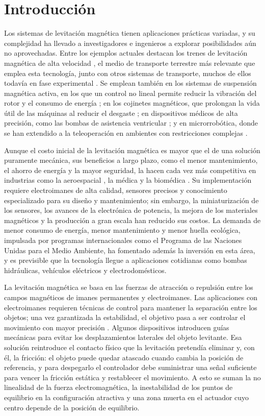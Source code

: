 \chapter{Introducción}

Los sistemas de levitación magnética tienen aplicaciones prácticas variadas, y su complejidad ha llevado a investigadores e ingenieros a explorar posibilidades aún no aprovechadas. Entre los ejemplos actuales destacan los trenes de levitación magnética de alta velocidad \cite{mingda}, el medio de transporte terrestre más relevante que emplea esta tecnología, junto con otros sistemas de transporte, muchos de ellos todavía en fase experimental \cite{hyung}. Se emplean también en los sistemas de suspensión magnética activa, en los que un control no lineal permite reducir la vibración del rotor y el consumo de energía \cite{charara}; en los cojinetes magnéticos, que prolongan la vida útil de las máquinas al reducir el desgaste \cite{debarghya}; en dispositivos médicos de alta precisión, como las bombas de asistencia ventricular \cite{gang1}; y en microrrobótica, donde se han extendido a la teleoperación en ambientes con restricciones complejas \cite{mir}.

Aunque el costo inicial de la levitación magnética es mayor que el de una solución puramente mecánica, sus beneficios a largo plazo, como el menor mantenimiento, el ahorro de energía y la mayor seguridad, la hacen cada vez más competitiva en industrias como la aeroespacial \cite{bryton}, la médica \cite{song} y la biomédica \cite{sajjad}. Su implementación requiere electroimanes de alta calidad, sensores precisos y conocimiento especializado para su diseño y mantenimiento; sin embargo, la miniaturización de los sensores, los avances de la electrónica de potencia, la mejora de los materiales magnéticos y la producción a gran escala han reducido sus costos. La demanda de menor consumo de energía, menor mantenimiento y menor huella ecológica, impulsada por programas internacionales como el Programa de las Naciones Unidas para el Medio Ambiente, ha fomentado además la inversión en esta área, y es previsible que la tecnología llegue a aplicaciones cotidianas como bombas hidráulicas, vehículos eléctricos y electrodomésticos.

La levitación magnética se basa en las fuerzas de atracción o repulsión entre los campos magnéticos de imanes permanentes y electroimanes. Las aplicaciones con electroimanes requieren técnicas de control para mantener la separación entre los objetos; una vez garantizada la estabilidad, el objetivo pasa a ser controlar el movimiento con mayor precisión \cite{hyung}. Algunos dispositivos introducen guías mecánicas para evitar los desplazamientos laterales del objeto levitante. Esa solución reintroduce el contacto físico que la levitación pretendía eliminar y, con él, la fricción: el objeto puede quedar atascado cuando cambia la posición de referencia, y para despegarlo el controlador debe suministrar una señal suficiente para vencer la fricción estática y restablecer el movimiento. A esto se suman la no linealidad de la fuerza electromagnética, la inestabilidad de los puntos de equilibrio en la configuración atractiva y una zona muerta en el actuador cuyo centro depende de la posición de equilibrio.

